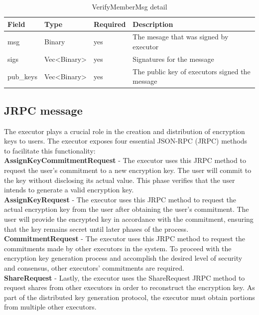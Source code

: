 \documentclass[../Main.tex]{subfiles}
\begin{document}
\begin{table}[H]
  \centering
  \begin{tabular}{|l|l|l|p{8cm}|}
\hline
\rowcolor[HTML]{F56B00} 
\textbf{Field} & \textbf{Type}                      & \textbf{Required} & \textbf{Description}                           \\ \hline
msg            & Binary                             & yes               & The mesage that was signed by executor         \\ \hline
sigs           & Vec\textless{}Binary\textgreater{} & yes               & Signatures for the message                     \\ \hline
pub\_keys      & Vec\textless{}Binary\textgreater{} & yes               & The public key of executors signed the message \\ \hline
\end{tabular}
  \caption{VerifyMemberMsg detail}
  \label{verifymember-msg-detail}
\end{table}

\subsection{JRPC message}
The executor plays a crucial role in the creation and distribution of encryption keys to users. The executor exposes four essential JSON-RPC (JRPC) methods to facilitate this functionality:\\
\indent \textbf{AssignKeyCommitmentRequest} - The executor uses this JRPC method to request the user's commitment to a new encryption key. The user will commit to the key without disclosing its actual value. This phase verifies that the user intends to generate a valid encryption key.\\
\indent \textbf{AssignKeyRequest} - The executor uses this JRPC method to request the actual encryption key from the user after obtaining the user's commitment. The user will provide the encrypted key in accordance with the commitment, ensuring that the key remains secret until later phases of the process.\\
\indent \textbf{CommitmentRequest} - The executor uses this JRPC method to request the commitments made by other executors in the system. To proceed with the encryption key generation process and accomplish the desired level of security and consensus, other executors' commitments are required.\\
\indent \textbf{ShareRequest} - Lastly, the executor uses the ShareRequest JRPC method to request shares from other executors in order to reconstruct the encryption key. As part of the distributed key generation protocol, the executor must obtain portions from multiple other executors.\\
\end{document}
